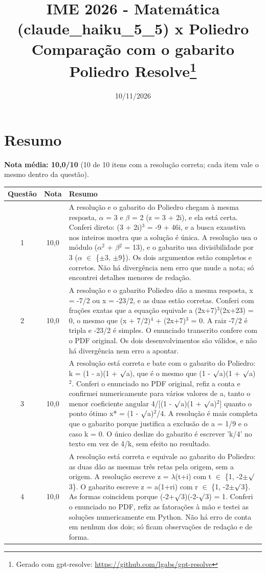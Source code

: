 \documentclass{article}%
\title{IME 2026 {-} Matemática (claude\_haiku\_5\_5) x Poliedro\\[4pt]\large Comparação com o gabarito Poliedro Resolve\thanks{Gerado com gpt-resolve: \url{https://github.com/lgabs/gpt-resolve}}}%
\date{10/11/2026}%
\begin{document}
%
\normalsize%
\maketitle%
\section*{Resumo}\textbf{Nota média: 10,0/10} (10 de 10 itens com a resolução correta; cada item vale o mesmo dentro da questão).\par\medskip%
\begin{longtable}{@{}c c p{}@{}}\toprule Questão & Nota & Resumo \\ \midrule
1 & 10,0 & A resolução e o gabarito do Poliedro chegam à mesma resposta, $\alpha$ = 3 e $\beta$ = 2 (z = 3 + 2i), e ela está certa. Conferi direto: (3 + 2i)$^3$ = -9 + 46i, e a busca exaustiva nos inteiros mostra que a solução é única. A resolução usa o módulo ($\alpha$$^2$ + $\beta$$^2$ = 13), e o gabarito usa divisibilidade por 3 ($\alpha$ $\in$ \{$\pm$3, $\pm$9\}). Os dois argumentos estão completos e corretos. Não há divergência nem erro que mude a nota; só encontrei detalhes menores de redação. \\
2 & 10,0 & A resolução e o gabarito Poliedro dão a mesma resposta, x = -7/2 ou x = -23/2, e as duas estão corretas. Conferi com frações exatas que a equação equivale a (2x+7)$^3$(2x+23) = 0, o mesmo que (x + 7/2)$^{4}$ + (2x+7)$^3$ = 0. A raiz -7/2 é tripla e -23/2 é simples. O enunciado transcrito confere com o PDF original. Os dois desenvolvimentos são válidos, e não há divergência nem erro a apontar. \\
3 & 10,0 & A resolução está correta e bate com o gabarito do Poliedro: k = (1 - a)(1 + $\surd$a), que é o mesmo que (1 - $\surd$a)(1 + $\surd$a)$^2$. Conferi o enunciado no PDF original, refiz a conta e confirmei numericamente para vários valores de a, tanto o menor coeficiente angular 4/{[}(1 - $\surd$a)(1 + $\surd$a)$^2${]} quanto o ponto ótimo x* = (1 - $\surd$a)$^2$/4. A resolução é mais completa que o gabarito porque justifica a exclusão de a = 1/9 e o caso k = 0. O único deslize do gabarito é escrever 'k/4' no texto em vez de 4/k, sem efeito no resultado. \\
4 & 10,0 & A resolução está correta e equivale ao gabarito do Poliedro: as duas dão as mesmas três retas pela origem, sem a origem. A resolução escreve z = $\lambda$(t+i) com t $\in$ \{1, -2$\pm$$\surd$3\}. O gabarito escreve z = a(1+ri) com r $\in$ \{1, -2$\pm$$\surd$3\}. As formas coincidem porque (-2+$\surd$3)(-2-$\surd$3) = 1. Conferi o enunciado no PDF, refiz as fatorações à mão e testei as soluções numericamente em Python. Não há erro de conta em nenhum dos dois; só ficam observações de redação e de forma. \\

\end{longtable}
\end{document}
